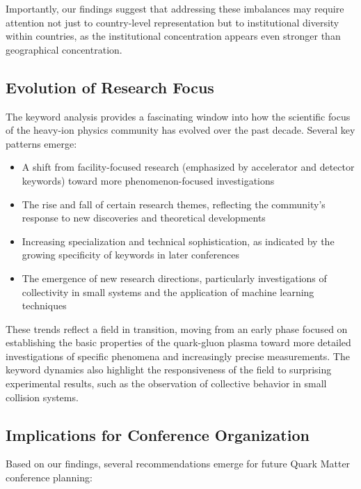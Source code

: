 \documentclass[a4paper,11pt]{article}
\begin{document}
Importantly, our findings suggest that addressing these imbalances may require attention not just to country-level representation but to institutional diversity within countries, as the institutional concentration appears even stronger than geographical concentration.

\subsection{Evolution of Research Focus}

The keyword analysis provides a fascinating window into how the scientific focus of the heavy-ion physics community has evolved over the past decade. Several key patterns emerge:

\begin{itemize}
    \item A shift from facility-focused research (emphasized by accelerator and detector keywords) toward more phenomenon-focused investigations
    \item The rise and fall of certain research themes, reflecting the community's response to new discoveries and theoretical developments
    \item Increasing specialization and technical sophistication, as indicated by the growing specificity of keywords in later conferences
    \item The emergence of new research directions, particularly investigations of collectivity in small systems and the application of machine learning techniques
\end{itemize}

These trends reflect a field in transition, moving from an early phase focused on establishing the basic properties of the quark-gluon plasma toward more detailed investigations of specific phenomena and increasingly precise measurements. The keyword dynamics also highlight the responsiveness of the field to surprising experimental results, such as the observation of collective behavior in small collision systems.

\subsection{Implications for Conference Organization}

Based on our findings, several recommendations emerge for future Quark Matter conference planning:
\end{document}

